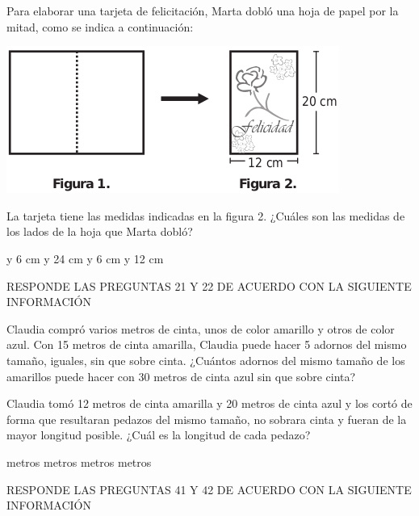 \documentclass[10pt,addpoints]{exam}
\begin{document}
\begin{multicols}{2}
\begin{questions}
\begin{oneparchoices}
\end{oneparchoices}
\question Para elaborar una tarjeta de felicitación, Marta dobló una hoja de papel por la mitad, como se indica a continuación:
\begin{center}
\includegraphics[scale=.5]{Images/Pantallazo-19.png} 
\end{center}
La tarjeta tiene las medidas indicadas en la figura 2.
¿Cuáles son las medidas de los lados de la hoja que Marta dobló?
\begin{choices}
 y 6 cm
 y 24 cm
 y 6 cm
 y 12 cm
\end{choices}
RESPONDE LAS PREGUNTAS 21 Y 22 DE ACUERDO CON LA SIGUIENTE INFORMACIÓN

Claudia compró varios metros de cinta, unos de color amarillo y otros de color azul.
\question Con 15 metros de cinta amarilla, Claudia puede hacer 5 adornos del mismo tamaño, iguales, sin que sobre cinta. ¿Cuántos adornos del mismo tamaño de los amarillos puede hacer con 30 metros de cinta azul sin que sobre cinta?

\begin{oneparchoices}
\end{oneparchoices}
\question Claudia tomó 12 metros de cinta amarilla y 20 metros de cinta azul y los cortó de forma que resultaran pedazos del mismo tamaño, no sobrara cinta y fueran de la mayor longitud posible. ¿Cuál es la longitud de cada pedazo?
\begin{choices}
 metros
 metros
 metros
 metros
\end{choices}
RESPONDE LAS PREGUNTAS 41 Y 42 DE ACUERDO CON LA SIGUIENTE INFORMACIÓN


\end{questions}
\end{multicols}
\end{document}
